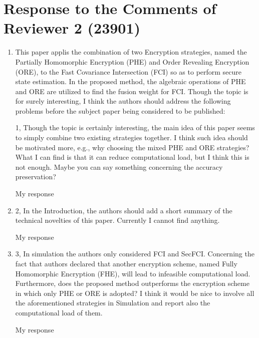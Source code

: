 \documentclass[a4paper]{scrartcl}
\newenvironment{rebuttal}{\begin{enumerate}[label={\color{grey}\thesection.\arabic{enumi}},leftmargin=0pt,ref=\thesection.\arabic{enumi}]}{\end{enumerate}}
\newcommand{\reviewtext}[1]{{\color{nblue} #1}}
\begin{document}



\section*{Response to the Comments of Reviewer 2 (23901)}
\def\thesection{R2}
\begin{rebuttal}
\item \reviewtext{This paper applis the combination of two Encryption strategies, named
the Partially Homomorphic Encryption (PHE) 
and Order Revealing Encryption (ORE), to the Fast Covariance
Intersection (FCI) so as to perform secure state estimation. In the
proposed method, the algebraic operations of PHE and ORE are utilized
to find the fusion weight for FCI. Though the topic is for surely
interesting, I think the authors should address the following problems
before the subject paper being considered to be published:

1, Though the topic is certainly interesting, the main idea of this
paper seems to simply combine two existing strategies together. I think
such idea should be motivated more, e.g., why choosing the mixed PHE
and ORE strategies? What I can find is that it can reduce computational
load, but I think this is not enough. Maybe you can say something
concerning the accuracy preservation? }

My response

\item \reviewtext{2, In the Introduction, the authors should add a short summary of the
technical novelties of this paper. Currently I cannot find anything.}

My response

\item \reviewtext{3, In simulation the authors only considered FCI and SecFCI. Concerning
the fact that authors declared that another encryption scheme, named
Fully Homomorphic Encryption (FHE), will lead to infeasible
computational load. Furthermore, does the proposed method outperforms
the encryption scheme in which only PHE or ORE is adopted? I think it
would be nice to involve all the aforementioned strategies in
Simulation and report also the computational load of them.}

My response

\end{rebuttal}
\end{document}

